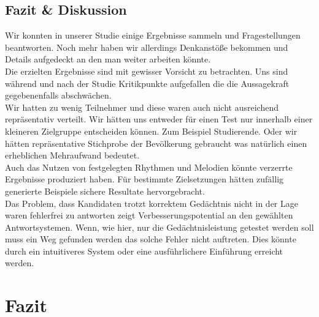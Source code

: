 \documentclass{acm_proc_article-sp}
\begin{document}
\subsection{Fazit \& Diskussion}
Wir konnten in unserer Studie einige Ergebnisse sammeln und Fragestellungen beantworten. Noch mehr haben wir allerdings Denkanstöße bekommen und Details aufgedeckt an den man weiter arbeiten könnte.\\
Die erzielten Ergebnisse sind mit gewisser Vorsicht zu betrachten. Uns sind während und nach der Studie Kritikpunkte aufgefallen die die Aussagekraft gegebenenfalls abschwächen.\\
Wir hatten zu wenig Teilnehmer und diese waren auch nicht ausreichend repräsentativ verteilt. Wir hätten uns entweder für einen Test nur innerhalb einer kleineren Zielgruppe entscheiden können. Zum Beispiel Studierende. Oder wir hätten repräsentative Stichprobe der Bevölkerung gebraucht was natürlich einen erheblichen Mehraufwand bedeutet.\\
Auch das Nutzen von festgelegten Rhythmen und Melodien könnte verzerrte Ergebnisse produziert haben. Für bestimmte Zielsetzungen hätten zufällig generierte Beispiele sichere Resultate hervorgebracht. \\
Das Problem, dass Kandidaten trotzt korrektem Gedächtnis nicht in der Lage waren fehlerfrei zu antworten zeigt Verbesserungspotential an den gewählten Antwortsystemen. Wenn, wie hier, nur die Gedächtnisleistung getestet werden soll muss ein Weg gefunden werden das solche Fehler nicht auftreten. Dies könnte durch ein intuitiveres System oder eine ausführlichere Einführung erreicht werden.


\section{Fazit}
\printbibliography
\end{document}
